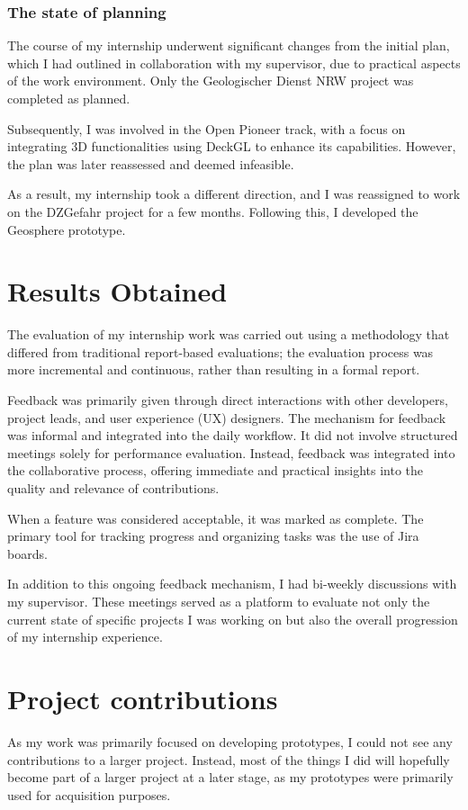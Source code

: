 \documentclass[11pt, titlepage, a4paper]{article}
\begin{document}
\subsubsection{The state of planning}
The course of my internship underwent significant changes from the initial plan, which I had outlined in collaboration with my supervisor, due to practical aspects of the work environment. Only the Geologischer Dienst NRW project was completed as planned.

Subsequently, I was involved in the Open Pioneer track, with a focus on integrating 3D functionalities using DeckGL to enhance its capabilities. However, the plan was later reassessed and deemed infeasible. 

As a result, my internship took a different direction, and I was reassigned to work on the DZGefahr project for a few months. Following this, I developed the Geosphere prototype.

\section{Results Obtained}
The evaluation of my internship work was carried out using a methodology that differed from traditional report-based evaluations; the evaluation process was more incremental and continuous, rather than resulting in a formal report.

Feedback was primarily given through direct interactions with other developers, project leads, and user experience (UX) designers. The mechanism for feedback was informal and integrated into the daily workflow. It did not involve structured meetings solely for performance evaluation. Instead, feedback was integrated into the collaborative process, offering immediate and practical insights into the quality and relevance of contributions.

When a feature was considered acceptable, it was marked as complete. The primary tool for tracking progress and organizing tasks was the use of Jira boards.

In addition to this ongoing feedback mechanism, I had bi-weekly discussions with my supervisor. These meetings served as a platform to evaluate not only the current state of specific projects I was working on but also the overall progression of my internship experience.

\section{Project contributions}
As my work was primarily focused on developing prototypes, I could not see any contributions to a larger project. Instead, most of the things I did will hopefully become part of a larger project at a later stage, as my prototypes were primarily used for acquisition purposes.
\end{document}
